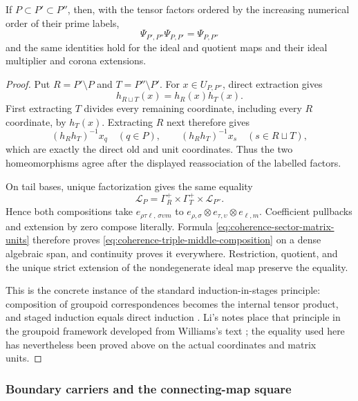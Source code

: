 \begin{proposition}
\label{prop:coherence-triple-inclusions}
If $P\subset P'\subset P''$, then, with the tensor factors ordered by the
increasing numerical order of their prime labels,
\begin{equation}
 \Psi_{P',P''}\Psi_{P,P'}=\Psi_{P,P''}
 \label{eq:coherence-triple-middle-composition}
\end{equation}
and the same identities hold for the ideal and quotient maps and their ideal
multiplier and corona extensions.
\end{proposition}

\begin{proof}
Put $R=P'\setminus P$ and $T=P''\setminus P'$.  For
$x\in U_{P,P''}$, direct extraction gives
\[
 h_{R\sqcup T}(x)=h_R(x)h_T(x).
\]
First extracting $T$ divides every remaining coordinate, including every
$R$ coordinate, by $h_T(x)$.  Extracting $R$ next therefore gives
\[
 (h_Rh_T)^{-1}x_q\quad(q\in P),\qquad
 (h_Rh_T)^{-1}x_s\quad(s\in R\sqcup T),
\]
which are exactly the direct old and unit coordinates.  Thus the two
homeomorphisms agree after the displayed reassociation of the labelled
factors.

On tail bases, unique factorization gives the same equality
\[
 \mathcal L_P=\Gamma_R^+\times\Gamma_T^+\times\mathcal L_{P''}.
\]
Hence both compositions take
$e_{\rho\tau\ell,\,\sigma\upsilon m}$ to
$e_{\rho,\sigma}\otimes e_{\tau,\upsilon}\otimes e_{\ell,m}$.
Coefficient pullbacks and extension by zero compose literally.  Formula
\eqref{eq:coherence-sector-matrix-units} therefore proves
\eqref{eq:coherence-triple-middle-composition} on a dense algebraic span,
and continuity proves it everywhere.  Restriction, quotient, and the unique
strict extension of the nondegenerate ideal map preserve the equality.

This is the concrete instance of the standard induction-in-stages principle:
composition of groupoid correspondences becomes the internal tensor product,
and staged induction equals direct induction
\cite[Section~8.4.3, p.~35]{li2024groupoidnotes}.  Li's notes place that
principle in the groupoid framework developed from Williams's text
\cite{williams2019toolkit}; the equality used here has nevertheless been
proved above on the actual coordinates and matrix units.
\end{proof}

\subsubsection{Boundary carriers and the connecting-map square}

